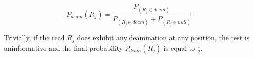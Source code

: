 \documentclass[a4paper,12pt]{article}
\begin{document}
\begin{equation}
P_{deam}(R_j) = \frac {P_(R_j \in deam)} {P_(R_j \in deam) +  P_(R_j \in null)}
\end{equation}

\noindent Trivially, if the read $R_j$ does exhibit any deamination at any position, the test is uninformative and the final probability $P_{deam}(R_j)$ is equal to $\frac {1} {2}$.





\end{document}
